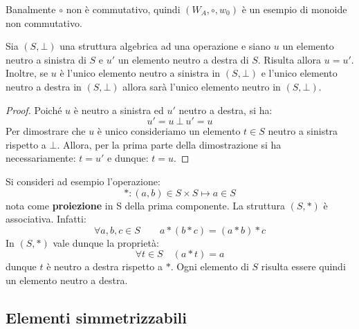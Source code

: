 \begin{osservation}
	Banalmente $\circ$ non è commutativo, quindi $(W_{A}, \circ, w_{0})$ è un esempio di monoide non commutativo.
\end{osservation}

\begin{teorbox}\label{thm:neutro}
	Sia $(S, \bot)$ una struttura algebrica ad una operazione e siano $u$ un elemento neutro a sinistra di $S$ e $u'$ un elemento neutro a destra di $S$. Risulta allora $u=u'$. Inoltre, se $u$ è l'unico elemento neutro a sinistra in $(S, \bot)$ e l'unico elemento neutro a destra in $(S, \bot)$ allora sarà l'unico elemento neutro in $(S,\bot)$.
\end{teorbox}


\begin{proof}
	Poiché $u$ è neutro a sinistra ed $u'$ neutro a destra, si ha: $$u'=u \ \bot \ u' =u$$
	Per dimostrare che $u$ è unico consideriamo un elemento $t \in S$ neutro a sinistra rispetto a $\bot$. Allora, per la prima parte della dimostrazione si ha necessariamente: $t = u'$ e dunque: $t=u$. 
\end{proof}


\begin{example}
	Si consideri ad esempio l'operazione:
\begin{displaymath}
	\ast : (a,b) \in S \times S \mapsto a \in S
\end{displaymath}
nota come \textbf{proiezione} in S della prima componente. La struttura $(S, \ast)$ è associativa. Infatti:
\begin{displaymath}
	\forall a,b,c \in S\qquad a \ast (b \ast c) = (a \ast b) \ast c
\end{displaymath}
In $(S, \ast)$ vale dunque la proprietà:
\begin{displaymath}
	\forall t \in S \quad (a \ast t) = a
\end{displaymath}
dunque $t$ è neutro a destra rispetto a $\ast$. Ogni elemento di $S$ risulta essere quindi un elemento neutro a destra.
\end{example}

\subsection{Elementi simmetrizzabili}

